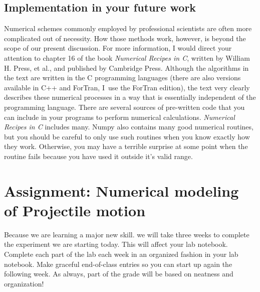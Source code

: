 \documentclass{book}
\begin{document}
\subsection{Implementation in your future work}

Numerical schemes commonly employed by professional scientists are often more
complicated out of necessity. How those methods work, however, is beyond the
scope of our present discussion. For more information, I would direct your
attention to chapter 16 of the book \emph{Numerical Recipes in C}, written by
William H. Press, et al., and published by Cambridge Press.\cite{press92}
Although the algorithms in the text are written in the C programming languages
(there are also versions available in C++ and ForTran, I\ use the ForTran
edition), the text very clearly describes these numerical processes in a way
that is essentially independent of the programming language. There are several
sources of pre-written code that you can include in your programs to perform
numerical calculations. \emph{Numerical Recipes in C} includes many. Numpy also contains many good numerical routines, but you
should be careful to only use such routines when you know exactly how they
work. Otherwise, you may have a terrible surprise at some point when the
routine fails because you have used it outside it's valid range.



\section{Assignment: Numerical modeling of Projectile motion}

{\small Because we are learning a major new skill. we will take three weeks to
complete the experiment we are starting today. This will affect your lab
notebook. Complete each part of the lab each week in an organized fashion in
your lab notebook. Make graceful end-of-class entries so you can start up
again the following week. As always, part of the grade will be based on
neatness and organization!}
\end{document}
